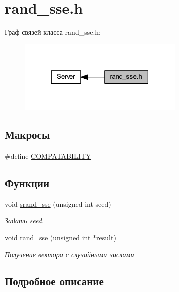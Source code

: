 \hypertarget{group__rand__sseh}{}\section{rand\+\_\+sse.\+h}
\label{group__rand__sseh}
Граф связей класса rand\+\_\+sse.\+h\+:\nopagebreak
\begin{figure}[H]
\begin{center}
\leavevmode
\includegraphics[width=225pt]{group__rand__sseh}
\end{center}
\end{figure}
\subsection*{Макросы}
\begin{DoxyCompactItemize}
\item 
\#define \mbox{\hyperlink{group__rand__sseh_ga63986cff5b50815b213aa8d6a9ab8768}{C\+O\+M\+P\+A\+T\+A\+B\+I\+L\+I\+TY}}
\end{DoxyCompactItemize}
\subsection*{Функции}
\begin{DoxyCompactItemize}
\item 
void \mbox{\hyperlink{group__rand__sseh_ga80db1a2aa7de7edf52b9c60e101d556f}{srand\+\_\+sse}} (unsigned int seed)
\begin{DoxyCompactList}\small\item\em Задать seed. \end{DoxyCompactList}\item 
void \mbox{\hyperlink{group__rand__sseh_gab7ae3ab6c8fb3e31548413dd0154db7d}{rand\+\_\+sse}} (unsigned int $\ast$result)
\begin{DoxyCompactList}\small\item\em Получение вектора с случайными числами \end{DoxyCompactList}\end{DoxyCompactItemize}


\subsection{Подробное описание}


